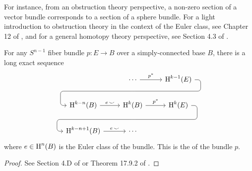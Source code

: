 For instance, from an obstruction theory perspective, a non-zero section of a vector bundle corresponds to a section of a sphere bundle. For a light introduction to obstruction theory in the context of the Euler class, see Chapter 12 of \cite{milnorstasheff1974}, and for a general homotopy theory perspective, see Section 4.3 of \cite{hatcher2002topology}.

\begin{theorem}\label{thm:gysin-sequence}
	For any $S^{n-1}$ fiber bundle  $p: E\to B$ over a simply-connected base $B$,
	there is a long exact sequence 
\[
	\begin{tikzcd}
	  & \cdots\rar{p^*} \snakenode{X} & \H^{k-1}(E)\snakearrow{X} \\
		{\H^{k-n}(B)}\rar{e\,\smile} & {\H^k(B)}\rar{p^*}\snakenode{Y} & {\H^k(E)}\snakearrow{Y} \\
		{\H^{k-n+1}(B)}\rar{e\,\smile} & \cdots
\end{tikzcd}
\]
	where $e\in \operatorname{H}^n(B)$ is the Euler class of the bundle. 
	This is the  of the bundle $p$.
\end{theorem}
\begin{proof}
	See Section 4.D of \cite{hatcher2002topology} or Theorem 17.9.2 of \cite{dieck2008algebraic}.
\end{proof}
